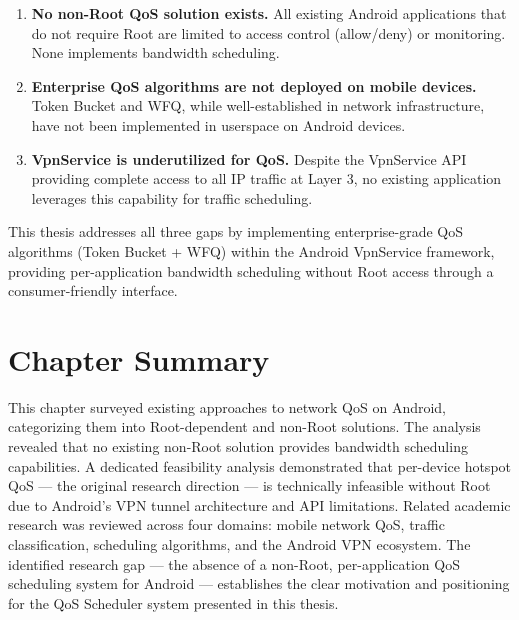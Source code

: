 \begin{enumerate}
    \item \textbf{No non-Root QoS solution exists.} All existing Android applications that do not require Root are limited to access control (allow/deny) or monitoring. None implements bandwidth scheduling.
    
    \item \textbf{Enterprise QoS algorithms are not deployed on mobile devices.} Token Bucket and WFQ, while well-established in network infrastructure, have not been implemented in userspace on Android devices.
    
    \item \textbf{VpnService is underutilized for QoS.} Despite the VpnService API providing complete access to all IP traffic at Layer 3, no existing application leverages this capability for traffic scheduling.
\end{enumerate}

This thesis addresses all three gaps by implementing enterprise-grade QoS algorithms (Token Bucket + WFQ) within the Android VpnService framework, providing per-application bandwidth scheduling without Root access through a consumer-friendly interface.


\section{Chapter Summary}
\label{sec:ch2_summary}

This chapter surveyed existing approaches to network QoS on Android, categorizing them into Root-dependent and non-Root solutions. The analysis revealed that no existing non-Root solution provides bandwidth scheduling capabilities. A dedicated feasibility analysis demonstrated that per-device hotspot QoS --- the original research direction --- is technically infeasible without Root due to Android's VPN tunnel architecture and API limitations. Related academic research was reviewed across four domains: mobile network QoS, traffic classification, scheduling algorithms, and the Android VPN ecosystem. The identified research gap --- the absence of a non-Root, per-application QoS scheduling system for Android --- establishes the clear motivation and positioning for the QoS Scheduler system presented in this thesis.
